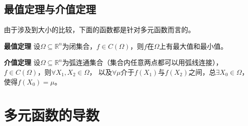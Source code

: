 \documentclass[UTF8,openany]{book}
\begin{document}
	\subsection{最值定理与介值定理}
	\par 由于涉及到大小的比较，下面的函数都是针对多元函数而言的。
	\par \textbf{最值定理} \quad
	设$\Omega\subseteq\mathbb{R}^n$为闭集合，$f\in C(\Omega)$，则$f$在$\Omega$上有最大值和最小值。
	\par \textbf{介值定理} \quad
	设$\Omega\subseteq\mathbb{R}^n$为弧连通集合（集合内任意两点都可以用弧线连接），$f\in C(\Omega)$，则$\forall X_1,X_2\in\Omega$，
	以及$\forall\mu$介于$f(X_1)$与$f(X_2)$之间，总$\exists X_0\in\Omega$，使得$f(X_0)=\mu$。
	\section{多元函数的导数}
\end{document}
